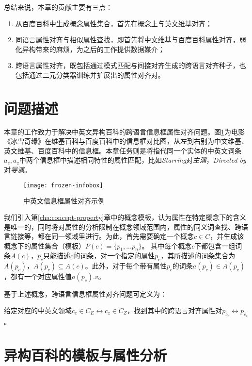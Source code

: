 总结来说，本章的贡献主要有三点：
\begin{enumerate}
\item 从百度百科中生成概念属性集合，首先在概念上与英文维基对齐；
\item 同语言属性对齐与相似属性查找，即首先将中文维基与百度百科属性对齐，弱化异构带来的麻烦，为之后的工作提供数据媒介；
\item 跨语言属性对齐，既包括通过模式匹配与间接对齐生成的跨语言对齐种子，也包括通过二元分类器训练并扩展出的属性对齐对。
\end{enumerate}

\section{问题描述}
本章的工作致力于解决中英文异构百科的跨语言信息框属性对齐问题。图\ref{fig:frozen-infobox}为电影《冰雪奇缘》在维基百科与百度百科中的信息框对比图，从左到右别为中文维基、英文维基、百度百科中的信息框。本章任务则是将指代同一个实体的中英文词条$a_e,a_z$中两个信息框中描述相同特性的属性匹配，比如\textit{Starring}对\textit{主演}，\textit{Directed by}对\textit{导演}。

\begin{figure}[h]
  \centering
  \texttt{[image: frozen-infobox]}
  \caption{中英文信息框属性对齐示例}
  \label{fig:frozen-infobox}
\end{figure}

我们引入第\ref{cha:concept-property}章中的{\heiti 概念模板}，认为属性在特定概念下的含义是唯一的，同时将对属性的分析限制在概念领域范围内，属性的同义词查找、跨语言链接等，都在同一领域里进行。为此，首先需要确定一个概念$c \in C$，并生成该概念下的属性集合（模板）$P(c)=\{p_1,...p_n\}$。
其中每个概念$c$下都包含一组词条$A(c)$，$p_c$只能描述$c$的词条，对一个指定的属性$p_c$，其所描述的词条集合为$A(p_c)$，$A(p_c) \subseteq A(c)$。此外，对于每个带有属性$p_c$的词条$a(p_c) \in A(p_c)$，都有一个对应属性值$a(p_c).v$。

基于上述概念，跨语言信息框属性对齐问题可定义为：
\begin{definition}
给定对应的中英文领域$c_e \in C_E \leftrightarrow c_z \in C_Z$，找到其中的跨语言对齐属性对$p_{c_e} \leftrightarrow p_{c_z}$。
\end{definition}

\section{异构百科的模板与属性分析}
\label{sec:template-property-analysis}

